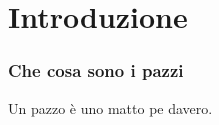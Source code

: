 \section{Introduzione}
\begin{frame}
  \frametitle{Che cosa sono i pazzi}
  \begin{definizione}
    Un \alert{pazzo} è uno matto pe davero.
  \end{definizione}
\end{frame}
